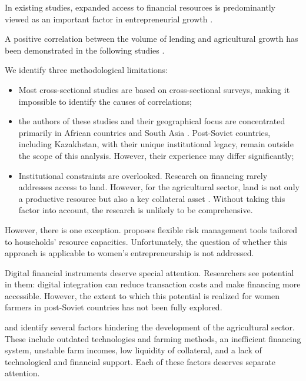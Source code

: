 ﻿\documentclass[pdflatex,sn-mathphys-ay]{sn-jnl}
\begin{document}
In existing studies, expanded access to financial resources is
predominantly viewed as an important factor in entrepreneurial growth
\citep{ref103}.

A positive correlation between the volume of lending and agricultural
growth has been demonstrated in the following studies
\citep{ref94,ref99,ref70,ref49,ref95,ref97,ref61}.

We identify three methodological limitations:

\begin{itemize}
\item Most cross-sectional studies are based on cross-sectional
surveys, making it impossible to identify the causes of correlations;
\item the authors of these studies and their geographical focus are
concentrated primarily in African countries and South Asia
\citep{ref90,ref58,ref42,ref71,ref44,ref97,ref84}. Post-Soviet countries, including Kazakhstan, with their
unique institutional legacy, remain outside the scope of this analysis.
However, their experience may differ significantly;
\item Institutional constraints are overlooked. Research on financing
rarely addresses access to land. However, for the agricultural sector,
land is not only a productive resource but also a key collateral asset
\citep{ref20,ref06}. Without taking this factor into
account, the research is unlikely to be comprehensive.
\end{itemize}

However, there is one exception. \citet{ref18} proposes
flexible risk management tools tailored to households' resource
capacities. Unfortunately, the question of whether this approach is
applicable to women's entrepreneurship is not addressed.

Digital financial instruments deserve special attention. Researchers see
potential in them: digital integration can reduce transaction costs and
make financing more accessible. However, the extent to which this
potential is realized for women farmers in post-Soviet countries has not
been fully explored.

\citet{ref63} and \citet{ref76} identify several factors
hindering the development of the agricultural sector. These include
outdated technologies and farming methods, an inefficient financing
system, unstable farm incomes, low liquidity of collateral, and a lack
of technological and financial support. Each of these factors deserves
separate attention.
\end{document}
